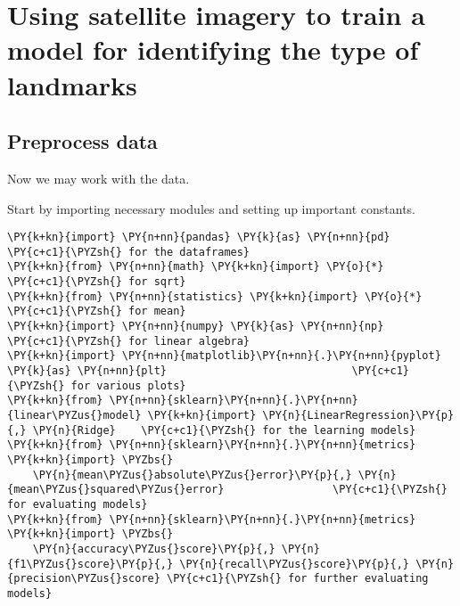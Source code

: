     \hypertarget{using-satellite-imagery-to-train-a-model-for-identifying-the-type-of-landmarks}{%
\section{Using satellite imagery to train a model for identifying the
type of
landmarks}\label{using-satellite-imagery-to-train-a-model-for-identifying-the-type-of-landmarks}}

    \hypertarget{preprocess-data}{%
\subsection{Preprocess data}\label{preprocess-data}}

Now we may work with the data.

Start by importing necessary modules and setting up important constants.

    \begin{tcolorbox}[breakable, size=fbox, boxrule=1pt, pad at break*=1mm,colback=cellbackground, colframe=cellborder]
\begin{Verbatim}[commandchars=\\\{\}]
\PY{k+kn}{import} \PY{n+nn}{pandas} \PY{k}{as} \PY{n+nn}{pd}                                         \PY{c+c1}{\PYZsh{} for the dataframes}
\PY{k+kn}{from} \PY{n+nn}{math} \PY{k+kn}{import} \PY{o}{*}                                          \PY{c+c1}{\PYZsh{} for sqrt}
\PY{k+kn}{from} \PY{n+nn}{statistics} \PY{k+kn}{import} \PY{o}{*}                                    \PY{c+c1}{\PYZsh{} for mean}
\PY{k+kn}{import} \PY{n+nn}{numpy} \PY{k}{as} \PY{n+nn}{np}                                          \PY{c+c1}{\PYZsh{} for linear algebra}
\PY{k+kn}{import} \PY{n+nn}{matplotlib}\PY{n+nn}{.}\PY{n+nn}{pyplot} \PY{k}{as} \PY{n+nn}{plt}                             \PY{c+c1}{\PYZsh{} for various plots}
\PY{k+kn}{from} \PY{n+nn}{sklearn}\PY{n+nn}{.}\PY{n+nn}{linear\PYZus{}model} \PY{k+kn}{import} \PY{n}{LinearRegression}\PY{p}{,} \PY{n}{Ridge}    \PY{c+c1}{\PYZsh{} for the learning models}
\PY{k+kn}{from} \PY{n+nn}{sklearn}\PY{n+nn}{.}\PY{n+nn}{metrics} \PY{k+kn}{import} \PYZbs{}
    \PY{n}{mean\PYZus{}absolute\PYZus{}error}\PY{p}{,} \PY{n}{mean\PYZus{}squared\PYZus{}error}                 \PY{c+c1}{\PYZsh{} for evaluating models}
\PY{k+kn}{from} \PY{n+nn}{sklearn}\PY{n+nn}{.}\PY{n+nn}{metrics} \PY{k+kn}{import} \PYZbs{}
    \PY{n}{accuracy\PYZus{}score}\PY{p}{,} \PY{n}{f1\PYZus{}score}\PY{p}{,} \PY{n}{recall\PYZus{}score}\PY{p}{,} \PY{n}{precision\PYZus{}score} \PY{c+c1}{\PYZsh{} for further evaluating models}
\end{Verbatim}
\end{tcolorbox}

